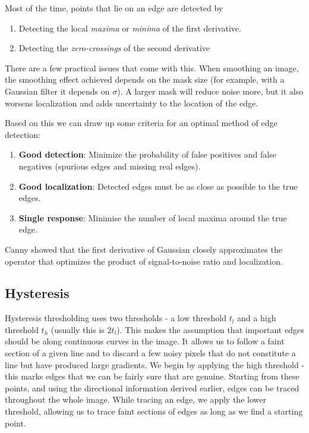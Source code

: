 \documentclass{article}
\begin{document}
	\par
	Most of the time, points that lie on an edge are detected by 
		\begin{enumerate}
			\item Detecting the local \textit{maxima} or \textit{minima} of the first derivative.
			\item Detecting the \textit{zero-crossings} of the second derivative
		\end{enumerate}
		
	There are a few practical issues that come with this. When smoothing an image, the smoothing effect achieved depends on the mask size (for example, with a Gaussian filter it depends on $\sigma$). A larger mask will reduce noise more, but it also worsens localization and adds uncertainty to the location of the edge.
	
	Based on this we can draw up some criteria for an optimal method of edge detection:
	\begin{enumerate}
		\item \textbf{Good detection}: Minimize the probability of false positives and false negatives (spurious edges and missing real edges).
		\item \textbf{Good localization}: Detected edges must be as close as possible to the true edges.
		\item \textbf{Single response}: Minimise the number of local maxima around the true edge.
	\end{enumerate}

	Canny showed that the first derivative of Gaussian closely approximates the operator that optimizes the product of signal-to-noise ratio and localization.

	\subsection{Hysteresis}
	Hysteresis thresholding uses two thresholds - a low threshold $t_{l}$ and a high threshold $t_{h}$ (usually this is $2t_{l}$). This makes the assumption that important edges should be along continuous curves in the image. It allows us to follow a faint section of a given line and to discard a few noisy pixels that do not constitute a line but have produced large gradients. We begin by applying the high threshold - this marks edges that we can be fairly sure that are genuine. Starting from these points, and using the directional information derived earlier, edges can be traced throughout the whole image. While tracing an edge, we apply the lower threshold, allowing us to trace faint sections of edges as long as we find a starting point. 
\end{document}
